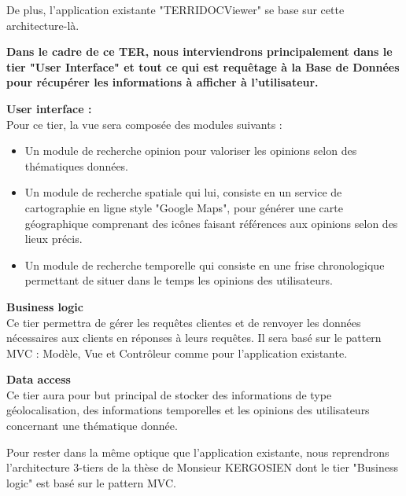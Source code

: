 De plus, l'application existante "TERRIDOCViewer" se base sur cette architecture-là.

\textbf{Dans le cadre de ce TER, nous interviendrons principalement dans le tier "User Interface" et tout ce qui est requêtage à la Base de Données pour récupérer les informations à afficher à l’utilisateur.}

\textbf{User interface :}\\

Pour ce tier, la vue sera composée des modules suivants : 
\begin{itemize}

\item Un module de recherche opinion pour valoriser les opinions selon des thématiques données.
\item Un module de recherche spatiale qui lui, consiste en un service de cartographie en ligne style "Google Maps", pour générer une carte géographique comprenant des icônes faisant références aux opinions selon des lieux précis.
\item Un module de recherche temporelle qui consiste en une frise chronologique permettant de situer dans le temps les opinions des utilisateurs.

\end{itemize}


\textbf{Business logic}\\
Ce tier permettra de gérer les requêtes clientes et de renvoyer les données nécessaires aux clients en réponses à leurs requêtes. Il sera basé sur  le pattern MVC : Modèle, Vue et Contrôleur comme pour l'application existante.


\textbf{Data access}\\

Ce tier aura pour but principal de stocker des informations de type géolocalisation, des informations temporelles et les opinions des utilisateurs concernant une thématique donnée.

Pour rester dans la même optique que l'application existante,  nous reprendrons l’architecture 3-tiers de la thèse de Monsieur KERGOSIEN dont le tier "Business logic" est basé sur le pattern MVC.


